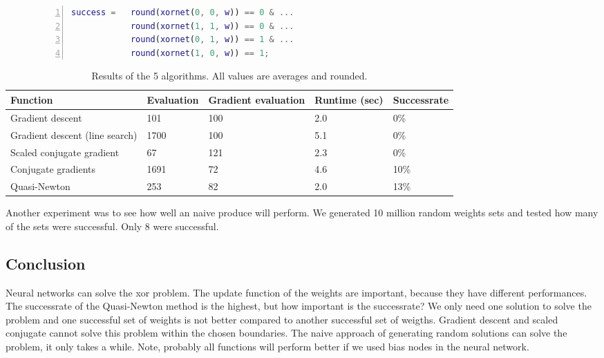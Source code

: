\documentclass{article}
\begin{document}
\begin{figure}[H]
	\begin{lstlisting}[caption={Success condition of a set of weights.}, label={eq:success}, captionpos=b, language=matlab, numbers=left, tabsize=4, frame=single, basicstyle=\footnotesize, breaklines=true, deletekeywords={round}]
success = 	round(xornet(0, 0, w)) == 0 & ...
			round(xornet(1, 1, w)) == 0 & ... 
			round(xornet(0, 1, w)) == 1 & ...
			round(xornet(1, 0, w)) == 1;
	\end{lstlisting}
\end{figure}

\newpage
\begin{table}[H]
	\centering
	\begin{tabular}{| l | l | l | l | l |}
		\hline
		Function & Evaluation & Gradient evaluation & Runtime (sec) & Successrate \\ \hline
		Gradient descent & 101 & 100 & 2.0 & 0\% \\ \hline
		Gradient descent (line search) & 1700 & 100 & 5.1 & 0\% \\ \hline
		Scaled conjugate gradient & 67 & 121 & 2.3 & 0\% \\ \hline
		Conjugate gradients & 1691 & 72 & 4.6 & 10\% \\ \hline
		Quasi-Newton & 253 & 82 & 2.0 & 13\% \\ \hline
	\end{tabular}
	\caption{Results of the 5 algorithms. All values are averages and rounded.}
	\label{table:results}
\end{table}

Another experiment was to see how well an naive produce will perform. We generated 10 million random weights sets and tested how many of the sets were successful. Only 8 were successful. 

\subsection{Conclusion}
Neural networks can solve the xor problem. The update function of the weights are important, because they have different performances. The successrate of the Quasi-Newton method is the highest, but how important is the successrate? We only need one solution to solve the problem and one successful set of weights is not better compared to another successful set of weigths. Gradient descent and scaled conjugate cannot solve this problem within the chosen boundaries. The naive approach of generating random solutions can solve the problem, it only takes a while. Note, probably all functions will perform better if we used bias nodes in the neural network.
\end{document}
